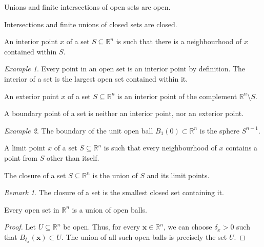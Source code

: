 \documentclass[11pt]{article}
\newcommand{\R}{\mathbb{R}}
\renewcommand{\vec}[1]{\boldsymbol{#1}}
\newcommand{\vx}{\vec{x}}
\theoremstyle{definition}
\theoremstyle{remark}
\newtheorem*{remark}{Remark}
\newtheorem*{example}{Example}
\numberwithin{equation}{section}
\begin{document}
    \begin{theorem}
        Unions and finite intersections of open sets are open.
    \end{theorem}
    \begin{corollary}
        Intersections and finite unions of closed sets are closed.
    \end{corollary}

    \begin{definition}
        An interior point $x$ of a set $S \subseteq \R^n$ is such that there is a
        neighbourhood of $x$ contained within $S$.
    \end{definition}
    \begin{example}
        Every point in an open set is an interior point by definition. The interior
        of a set is the largest open set contained within it.
    \end{example}

    \begin{definition}
        An exterior point $x$ of a set $S \subseteq \R^n$ is an interior point of the
        complement $\R^n \setminus S$.
    \end{definition}

    \begin{definition}
        A boundary point of a set is neither an interior point, nor an exterior point.
    \end{definition}
    \begin{example}
        The boundary of the unit open ball $B_1(0) \subset \R^n$ is the sphere $S^{n
        - 1}$.
    \end{example}

    \begin{definition}
        A limit point $x$ of a set $S \subseteq \R^n$ is such that every
        neighbourhood of $x$ contains a point from $S$ other than itself.
    \end{definition}
    \begin{definition}
        The closure of a set $S \subseteq \R^n$ is the union of $S$ and its limit
        points.
        \begin{remark}
            The closure of a set is the smallest closed set containing it.
        \end{remark}
    \end{definition}

    \begin{lemma}
        Every open set in $\R^n$ is a union of open balls.
    \end{lemma}
    \begin{proof}
        Let $U\subseteq \R^n$ be open. Thus, for every $\vx\in\R^n$, we can choose
        $\delta_x > 0$ such that $B_{\delta_x}(\vx) \subset U$. The union of all such
        open balls is precisely the set $U$.
    \end{proof}
\end{document}
